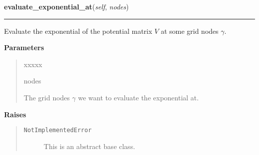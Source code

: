     \vspace{0.5ex}

\hspace{.8\funcindent}\begin{boxedminipage}{\funcwidth}

    \raggedright \textbf{evaluate\_exponential\_at}(\textit{self}, \textit{nodes})

    \vspace{-1.5ex}

    \rule{\textwidth}{0.5\fboxrule}
\setlength{\parskip}{2ex}
    Evaluate the exponential of the potential matrix $V$ at some grid
    nodes $\gamma$.

\setlength{\parskip}{1ex}
      \textbf{Parameters}
      \vspace{-1ex}

      \begin{quote}
        \begin{Ventry}{xxxxx}

          \item[nodes]

          The grid nodes $\gamma$ we want to evaluate the
          exponential at.

        \end{Ventry}

      \end{quote}

      \textbf{Raises}
    \vspace{-1ex}

      \begin{quote}
        \begin{description}

          \item[\texttt{NotImplementedError}]

          This is an abstract base class.

        \end{description}

      \end{quote}

    \end{boxedminipage}

    \label{MatrixPotential:MatrixPotential:calculate_jacobian}

    \vspace{0.5ex}


